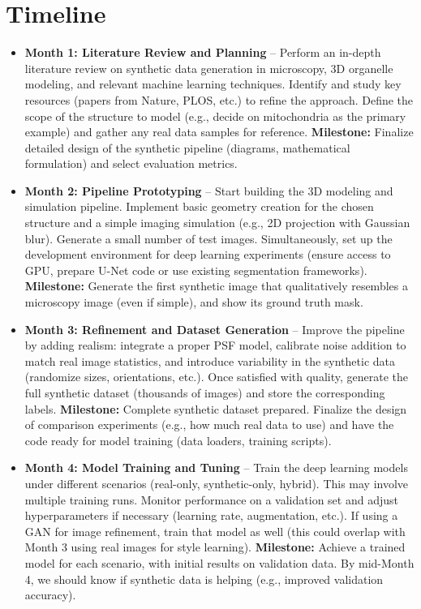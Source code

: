 \documentclass[
oneside,      %
openany       %
]{imc-inf}
\begin{document}
	
	\section{Timeline}
	
	\begin{itemize}
		\item \textbf{Month 1: Literature Review and Planning} – Perform an in-depth literature review on synthetic data generation in microscopy, 3D organelle modeling, and relevant machine learning techniques. Identify and study key resources (papers from Nature, PLOS, etc.) to refine the approach. Define the scope of the structure to model (e.g., decide on mitochondria as the primary example) and gather any real data samples for reference. \textbf{Milestone:} Finalize detailed design of the synthetic pipeline (diagrams, mathematical formulation) and select evaluation metrics.
		
		\item \textbf{Month 2: Pipeline Prototyping} – Start building the 3D modeling and simulation pipeline. Implement basic geometry creation for the chosen structure and a simple imaging simulation (e.g., 2D projection with Gaussian blur). Generate a small number of test images. Simultaneously, set up the development environment for deep learning experiments (ensure access to GPU, prepare U-Net code or use existing segmentation frameworks). \textbf{Milestone:} Generate the first synthetic image that qualitatively resembles a microscopy image (even if simple), and show its ground truth mask.
		
		\item \textbf{Month 3: Refinement and Dataset Generation} – Improve the pipeline by adding realism: integrate a proper PSF model, calibrate noise addition to match real image statistics, and introduce variability in the synthetic data (randomize sizes, orientations, etc.). Once satisfied with quality, generate the full synthetic dataset (thousands of images) and store the corresponding labels. \textbf{Milestone:} Complete synthetic dataset prepared. Finalize the design of comparison experiments (e.g., how much real data to use) and have the code ready for model training (data loaders, training scripts).
		
		\item \textbf{Month 4: Model Training and Tuning} – Train the deep learning models under different scenarios (real-only, synthetic-only, hybrid). This may involve multiple training runs. Monitor performance on a validation set and adjust hyperparameters if necessary (learning rate, augmentation, etc.). If using a GAN for image refinement, train that model as well (this could overlap with Month 3 using real images for style learning). \textbf{Milestone:} Achieve a trained model for each scenario, with initial results on validation data. By mid-Month 4, we should know if synthetic data is helping (e.g., improved validation accuracy).
		

\end{itemize}
\end{document}
